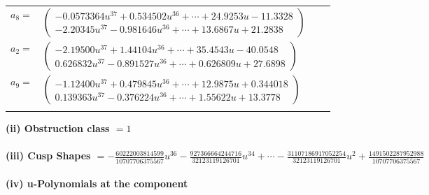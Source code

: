 \documentclass[1p]{elsarticle_modified}
\theoremstyle{definition}
\begin{document}
\begin{tabular}{m{7pt} m{180pt} m{7pt} m{180pt} }
\flushright $a_{8}=$&$\begin{pmatrix}-0.0573364 u^{37}+0.534502 u^{36}+\cdots+24.9253 u-11.3328\\-2.20345 u^{37}-0.981646 u^{36}+\cdots+13.6867 u+21.2838\end{pmatrix}$ \\
\flushright $a_{2}=$&$\begin{pmatrix}-2.19500 u^{37}+1.44104 u^{36}+\cdots+35.4543 u-40.0548\\0.626832 u^{37}-0.891527 u^{36}+\cdots+0.626809 u+27.6898\end{pmatrix}$ \\
\flushright $a_{9}=$&$\begin{pmatrix}-1.12400 u^{37}+0.479845 u^{36}+\cdots+12.9875 u+0.344018\\0.139363 u^{37}-0.376224 u^{36}+\cdots+1.55622 u+13.3778\end{pmatrix}$\\&\end{tabular}
\flushleft \textbf{(ii) Obstruction class $= 1$}\\~\\
\flushleft \textbf{(iii) Cusp Shapes $= -\frac{60222003814599}{10707706375567} u^{36}-\frac{927366664244716}{32123119126701} u^{34}+\cdots-\frac{31107186917052254}{32123119126701} u^2+\frac{1491502287952988}{10707706375567}$}\\~\\
\newpage\renewcommand{\arraystretch}{1}
\flushleft \textbf{(iv) u-Polynomials at the component}\newline \\
\end{document}
